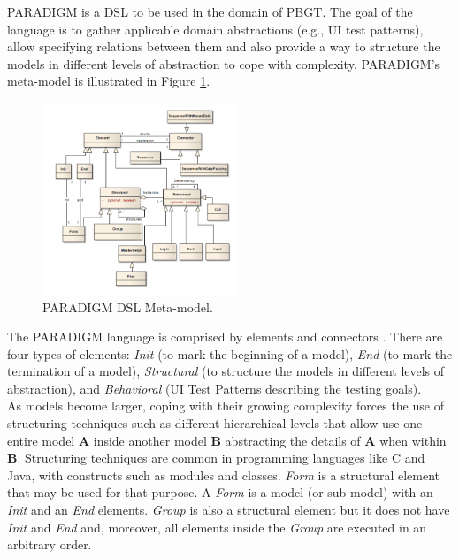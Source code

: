 \documentclass[conference]{IEEEtran}
\begin{document}
PARADIGM is a DSL to be used in the domain of PBGT. The goal of the language is to gather applicable domain abstractions (e.g., UI test patterns), allow specifying relations between them and also provide a way to structure the models in different levels of abstraction to cope with complexity. PARADIGM's meta-model is illustrated in Figure \ref{fig:dsl}.\\
\begin{figure}[!htb]
\centering
\includegraphics[width=0.52\textwidth]{dsl}
\caption{PARADIGM DSL Meta-model.}
\label{fig:dsl}
\end{figure}

The PARADIGM language is comprised by elements and connectors \cite{moreira2013pattern}. There are four types of elements: \textit{Init} (to mark the beginning of a model), \textit{End} (to mark the termination of a model), \textit{Structural} (to structure the models in different levels of abstraction), and \textit{Behavioral} (UI Test Patterns describing the testing goals).\\

As models become larger, coping with their growing complexity forces the use of structuring techniques such as different hierarchical levels that allow use one entire model \textbf{A} inside another model \textbf{B} abstracting the details of \textbf{A} when within \textbf{B}. Structuring techniques are common in programming languages like C and Java, with constructs such as modules and classes. \textit{Form} is a structural element that may be used for that purpose. A \textit{Form} is a model (or sub-model) with an \textit{Init} and an \textit{End} elements. \textit{Group} is also a structural element but it does not have \textit{Init} and \textit{End} and, moreover, all elements inside the \textit{Group} are executed in an arbitrary order.\\
\end{document}
